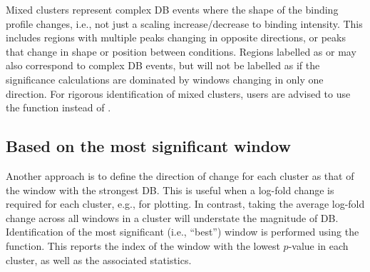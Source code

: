 \documentclass{report}\usepackage[]{graphicx}\usepackage[usenames,dvipsnames]{color}
\newcommand{\hlopt}[1]{\textcolor[rgb]{0,0,0}{#1}}%
\newcommand{\hlstd}[1]{\textcolor[rgb]{0.251,0.251,0.251}{#1}}%
\newcommand{\hlkwb}[1]{\textcolor[rgb]{0,0,0}{#1}}%
\newcommand{\hlkwd}[1]{\textcolor[rgb]{0.878,0.439,0.125}{#1}}%
\newenvironment{knitrout}{}{} %
\begin{document}
Mixed clusters represent complex DB events where the shape of the binding profile changes, i.e., not just a scaling increase/decrease to binding intensity.
This includes regions with multiple peaks changing in opposite directions, or peaks that change in shape or position between conditions.
Regions labelled as  or  may also correspond to complex DB events,
but will not be labelled as  if the significance calculations are dominated by windows changing in only one direction.
For rigorous identification of mixed clusters, users are advised to use the  function instead of .

\subsection{Based on the most significant window}
Another approach is to define the direction of change for each cluster as that of the window with the strongest DB.
This is useful when a log-fold change is required for each cluster, e.g., for plotting.
In contrast, taking the average log-fold change across all windows in a cluster will understate the magnitude of DB.
Identification of the most significant (i.e., ``best'') window is performed using the  function.
This reports the index of the window with the lowest $p$-value in each cluster, as well as the associated statistics.

\begin{knitrout}
\color{fgcolor}
\end{knitrout}
\end{document}
